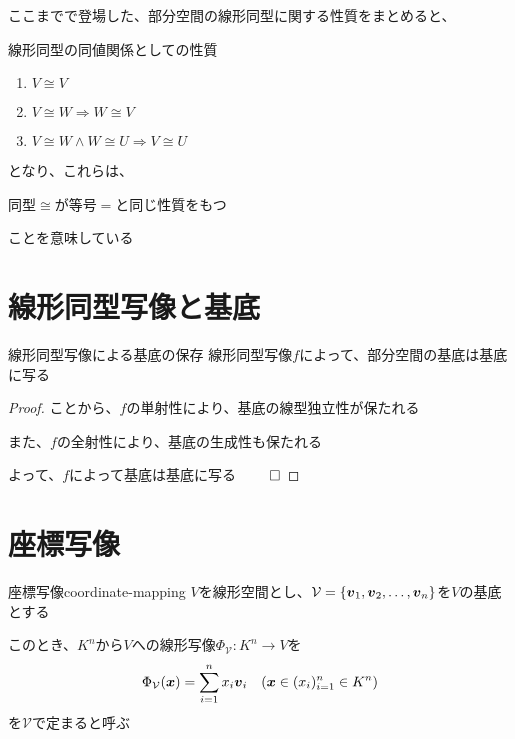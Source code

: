 \documentclass[../../../topic_linear-algebra]{subfiles}
\begin{document}
\sectionline

ここまでで登場した、部分空間の線形同型に関する性質をまとめると、

\begin{theorem*}{線形同型の同値関係としての性質}
  \begin{enumerate}[label=\romanlabel]
    \item $V \cong V$
    \item $V \cong W \Longrightarrow W \cong V$
    \item $V \cong W \land W \cong U \Longrightarrow V \cong U$
  \end{enumerate}
\end{theorem*}

となり、これらは、
\begin{shaded}
  同型$\cong$が等号$=$と同じ性質をもつ
\end{shaded}
ことを意味している

\sectionline
\section{線形同型写像と基底}

\begin{theorem*}{線形同型写像による基底の保存}
  線形同型写像$f$によって、部分空間の基底は基底に写る
\end{theorem*}

\begin{proof}
  ことから、$f$の単射性により、基底の線型独立性が保たれる

  また、$f$の全射性により、基底の生成性も保たれる

  よって、$f$によって基底は基底に写る $\qed$
\end{proof}

\sectionline
\section{座標写像}

\begin{mindflow}
\end{mindflow}

\begin{definition}{座標写像}{coordinate-mapping}
  $V$を線形空間とし、$\mathcal{V} = \{ \vb*{v}_1, \vb*{v}_2, \dots, \vb*{v}_n \}$を$V$の基底とする

  このとき、$K^n$から$V$への線形写像$\Phi_{\mathcal{V}}\colon K^n \to V$を
  \begin{equation*}
    \Phi_{\mathcal{V}}(\vb*{x}) = \sum_{i=1}^n x_i \vb*{v}_i \quad (\vb*{x} \in (x_i)_{i=1}^n \in K^n)
  \end{equation*}
  を$\mathcal{V}$で定まると呼ぶ
\end{definition}
\end{document}
